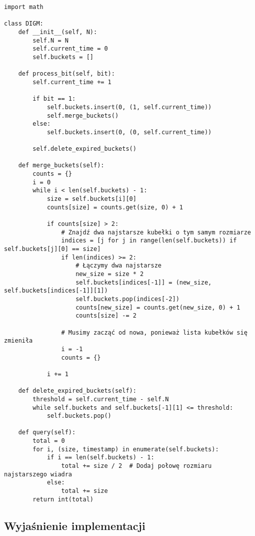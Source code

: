 \documentclass{article}
\begin{document}
\begin{lstlisting}[style=pystyle, caption=Implementacja algorytmu DGIM]
import math

class DIGM:
    def __init__(self, N):
        self.N = N
        self.current_time = 0
        self.buckets = []

    def process_bit(self, bit):
        self.current_time += 1

        if bit == 1:
            self.buckets.insert(0, (1, self.current_time))
            self.merge_buckets()
        else:
            self.buckets.insert(0, (0, self.current_time))

        self.delete_expired_buckets()

    def merge_buckets(self):
        counts = {}
        i = 0
        while i < len(self.buckets) - 1:
            size = self.buckets[i][0]
            counts[size] = counts.get(size, 0) + 1

            if counts[size] > 2:
                # Znajdź dwa najstarsze kubełki o tym samym rozmiarze
                indices = [j for j in range(len(self.buckets)) if self.buckets[j][0] == size]
                if len(indices) >= 2:
                    # Łączymy dwa najstarsze
                    new_size = size * 2
                    self.buckets[indices[-1]] = (new_size, self.buckets[indices[-1]][1])
                    self.buckets.pop(indices[-2])
                    counts[new_size] = counts.get(new_size, 0) + 1
                    counts[size] -= 2

                # Musimy zacząć od nowa, ponieważ lista kubełków się zmieniła
                i = -1
                counts = {}

            i += 1

    def delete_expired_buckets(self):
        threshold = self.current_time - self.N
        while self.buckets and self.buckets[-1][1] <= threshold:
            self.buckets.pop()

    def query(self):
        total = 0
        for i, (size, timestamp) in enumerate(self.buckets):
            if i == len(self.buckets) - 1:
                total += size / 2  # Dodaj połowę rozmiaru najstarszego wiadra
            else:
                total += size
        return int(total)
\end{lstlisting}

\subsection{Wyjaśnienie implementacji}
\end{document}
